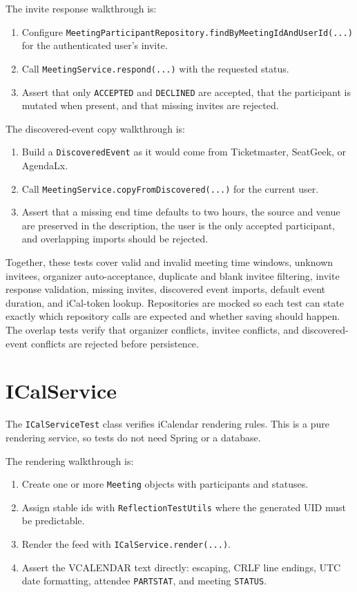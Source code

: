 \newpage 

The invite response walkthrough is:

\begin{enumerate}
\item Configure \texttt{MeetingParticipantRepository.findByMeetingIdAndUserId(...)} for the authenticated user's invite.
\item Call \texttt{MeetingService.respond(...)} with the requested status.
\item Assert that only \texttt{ACCEPTED} and \texttt{DECLINED} are accepted, that the participant is mutated when present, and that missing invites are rejected.
\end{enumerate}

The discovered-event copy walkthrough is:

\begin{enumerate}
\item Build a \texttt{DiscoveredEvent} as it would come from Ticketmaster, SeatGeek, or AgendaLx.
\item Call \texttt{MeetingService.copyFromDiscovered(...)} for the current user.
\item Assert that a missing end time defaults to two hours, the source and venue are preserved in the description, the user is the only accepted participant, and overlapping imports should be rejected.
\end{enumerate}

Together, these tests cover valid and invalid meeting time windows, unknown invitees, organizer auto-acceptance, duplicate and blank invitee filtering, invite response validation, missing invites, discovered event imports, default event duration, and iCal-token lookup. Repositories are mocked so each test can state exactly which repository calls are expected and whether saving should happen. The overlap tests verify that organizer conflicts, invitee conflicts, and discovered-event conflicts are rejected before persistence.

\section{ICalService}

The \texttt{ICalServiceTest} class verifies iCalendar rendering rules. This is a pure rendering service, so tests do not need Spring or a database.

The rendering walkthrough is:

\begin{enumerate}
\item Create one or more \texttt{Meeting} objects with participants and statuses.
\item Assign stable ids with \texttt{ReflectionTestUtils} where the generated UID must be predictable.
\item Render the feed with \texttt{ICalService.render(...)}.
\item Assert the VCALENDAR text directly: escaping, CRLF line endings, UTC date formatting, attendee \texttt{PARTSTAT}, and meeting \texttt{STATUS}.
\end{enumerate}

